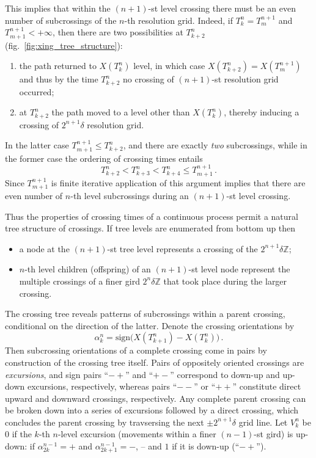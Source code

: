 \documentclass[a4paper]{article}
\begin{document}
This implies that within the $(n+1)$-st level crossing there must be an even number
of subcrossings of the $n$-th resolution grid. Indeed, if $T_k^n = T_m^{n+1}$ and
$T_{m+1}^{n+1}<+\infty$, then there are two possibilities at $T_{k+2}^n$ (fig.~\ref{fig:xing_tree_structure}):
\begin{enumerate}
	\item the path returned to $X(T_k^n)$ level, in which case $X(T_{k+2}^n) = X(T_m^{n+1})$
    and thus by the time $T_{k+2}^n$ no crossing of $(n+1)$-st resolution grid occurred;
    \item at $T_{k+2}^n$ the path moved to a level other than $X(T_k^n)$, thereby
    inducing a crossing of $2^{n+1} \delta$ resolution grid.
\end{enumerate}
In the latter case $T_{m+1}^{n+1} \leq T_{k+2}^n$, and there are exactly \emph{two}
subcrossings, while in the former case the ordering of crossing times entails
\begin{equation*}\label{eq:subxing_order}
  T_{k+2}^n < T_{k+3}^n < T_{k+4}^n \leq T_{m+1}^{n+1} \,.
\end{equation*}
Since $T_{m+1}^{n+1}$ is finite iterative application of this argument implies that
there are even number of $n$-th level subcrossings during an $(n+1)$-st level
crossing.

Thus the properties of crossing times of a continuous process permit a natural tree
structure of crossings. If tree levels are enumerated from bottom up then
\begin{itemize}
	\item a node at the $(n+1)$-st tree level represents a crossing of the $2^{n+1} \delta \mathbb{Z}$;
	\item $n$-th level children (offspring) of an $(n+1)$-st level node represent the
	multiple crossings of a finer gird $2^n\delta \mathbb{Z}$ that took place during
	the larger crossing. 
\end{itemize}

The crossing tree reveals patterns of subcrossings within a parent crossing,
conditional on the direction of the latter. Denote the crossing orientations by
\[ \alpha_k^n = \text{sign}\bigl( X(T_{k+1}^n) - X(T_k^n)\bigr)
    \,. \]
Then subcrossing orientations of a complete crossing come in pairs by construction
of the crossing tree itself. Pairs of oppositely oriented crossings are
\emph{excursions}, and sign pairs ``$-+$'' and ``$+-$'' correspond to down-up
and up-down excursions, respectively, whereas pairs ``$--$'' or ``$++$'' constitute
direct upward and downward crossings, respectively. Any complete parent crossing
can be broken down into a series of excursions followed by a direct crossing, which
concludes the parent crossing by travsersing the next $\pm2^{n+1} \delta$ grid line.
Let $V_k^n$ be $0$ if the $k$-th $n$-level excursion (movements within a finer $(n-1)$-st
gird) is up-down: if $\alpha_{2k}^{n-1} = +$ and $\alpha_{2k+1}^{n-1} = -$, --
and $1$ if it is down-up (``$-+$'').
\end{document}
